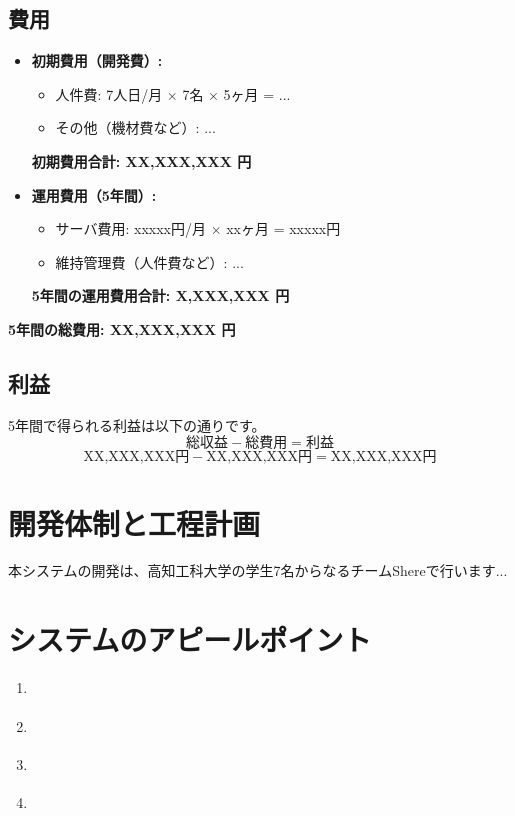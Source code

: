 \documentclass[a4j, 11pt, report]{jsarticle}
\begin{document}
\subsection{費用}
\begin{itemize}
    \item \textbf{初期費用（開発費）:}
        \begin{itemize}
            \item 人件費: 7人日/月 $\times$ 7名 $\times$ 5ヶ月 = ...
            \item その他（機材費など）: ...
        \end{itemize}
        \textbf{初期費用合計: XX,XXX,XXX 円}
    \item \textbf{運用費用（5年間）:}
        \begin{itemize}
            \item サーバ費用: xxxxx円/月 $\times$ xxヶ月 = xxxxx円
            \item 維持管理費（人件費など）: ...
        \end{itemize}
        \textbf{5年間の運用費用合計: X,XXX,XXX 円}
\end{itemize}
\textbf{5年間の総費用: XX,XXX,XXX 円}

\subsection{利益}
5年間で得られる利益は以下の通りです。
$$
\text{総収益} - \text{総費用} = \text{利益}
$$
$$
\text{XX,XXX,XXX円} - \text{XX,XXX,XXX円} = \text{XX,XXX,XXX円}
$$

\section{開発体制と工程計画}

本システムの開発は、高知工科大学の学生7名からなるチームShereで行います...



\section{システムのアピールポイント}
\begin{enumerate}
    \item \textbf{} 
    \item \textbf{} 
    \item \textbf{} 
    \item \textbf{} 
\end{enumerate}
\end{document}
